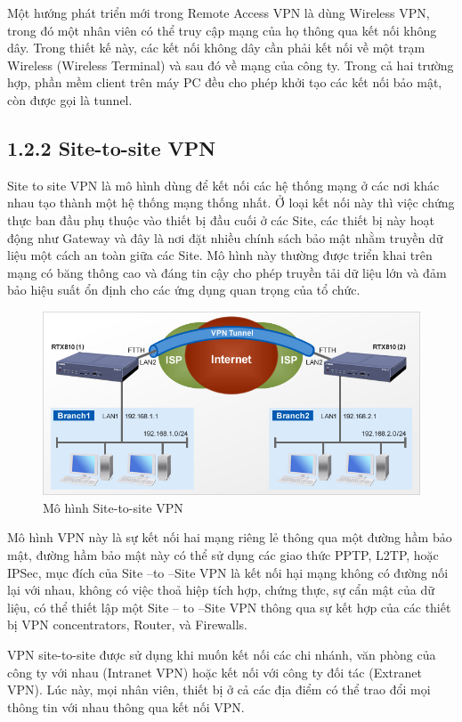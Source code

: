     Một hướng phát triển mới trong Remote Access VPN là dùng Wireless VPN, trong đó một nhân viên có thể truy cập mạng của họ thông qua kết nối không dây. Trong thiết kế này, các kết nối không dây cần phải kết nối về một trạm Wireless (Wireless Terminal) và sau đó về mạng của công ty. Trong cả hai trường hợp, phần mềm client trên máy PC đều cho phép khởi tạo các kết nối bảo mật, còn được gọi là tunnel.
    
    \subsection*{1.2.2 Site-to-site VPN}

    Site to site VPN là mô hình dùng để kết nối các hệ thống mạng ở các nơi khác nhau tạo thành một hệ thống mạng thống nhất. Ở loại kết nối này thì việc chứng thực ban đầu phụ thuộc vào thiết bị đầu cuối ở các Site, các thiết bị này hoạt động như Gateway và đây là nơi đặt nhiều chính sách bảo mật nhằm truyền dữ liệu một cách an toàn giữa các Site. Mô hình này thường được triển khai trên mạng có băng thông cao và đáng tin cậy cho phép truyền tải dữ liệu lớn và đảm bảo hiệu suất ổn định cho các ứng dụng quan trọng của tổ chức.
    \begin{figure}[htbp]
        \centering
        \includegraphics[width=0.6\linewidth]{img/Sitetosite.png}
        \caption{Mô hình Site-to-site VPN}
    \end{figure}


    Mô hình VPN này là sự kết nối hai mạng riêng lẻ thông qua một đường hầm bảo mật, đường hầm bảo mật này có thể sử dụng các giao thức PPTP, L2TP, hoặc IPSec, mục đích của Site –to –Site VPN là kết nối hại mạng không có đường nối lại với nhau, không có việc thoả hiệp tích hợp, chứng thực, sự cẩn mật của dữ liệu, có thể thiết lập một Site – to –Site VPN thông qua sự kết hợp của các thiết bị VPN concentrators, Router, và Firewalls.

    VPN site-to-site được sử dụng khi muốn kết nối các chi nhánh, văn phòng của công ty với nhau (Intranet VPN) hoặc kết nối với công ty đối tác (Extranet VPN). Lúc này, mọi nhân viên, thiết bị ở cả các địa điểm có thể trao đổi mọi thông tin với nhau thông qua kết nối VPN.


